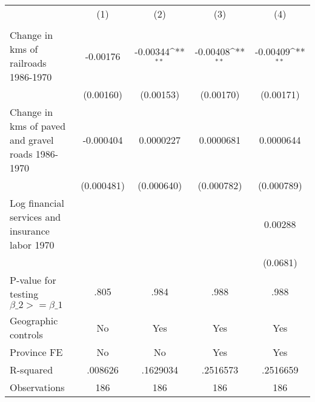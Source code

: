 {
\def\sym#1{\ifmmode^{#1}\else\(^{#1}\)\fi}
\begin{tabular}{l*{4}{c}}
\hline\hline
                &\multicolumn{1}{c}{(1)}&\multicolumn{1}{c}{(2)}&\multicolumn{1}{c}{(3)}&\multicolumn{1}{c}{(4)}\\
                &\multicolumn{1}{c}{}&\multicolumn{1}{c}{}&\multicolumn{1}{c}{}&\multicolumn{1}{c}{}\\
\hline
Change in kms of railroads 1986-1970& -0.00176         & -0.00344\sym{**} & -0.00408\sym{**} & -0.00409\sym{**} \\
                &(0.00160)         &(0.00153)         &(0.00170)         &(0.00171)         \\
[1em]
Change in kms of paved and gravel roads 1986-1970&-0.000404         &0.0000227         &0.0000681         &0.0000644         \\
                &(0.000481)         &(0.000640)         &(0.000782)         &(0.000789)         \\
[1em]
Log financial services and insurance labor 1970&                  &                  &                  &  0.00288         \\
                &                  &                  &                  & (0.0681)         \\
\hline
P-value for testing $\beta\_{2} >= \beta\_{1}$&     .805         &     .984         &     .988         &     .988         \\
Geographic controls&       No         &      Yes         &      Yes         &      Yes         \\
Province FE     &       No         &       No         &      Yes         &      Yes         \\
R-squared       &  .008626         & .1629034         & .2516573         & .2516659         \\
Observations    &      186         &      186         &      186         &      186         \\
\hline\hline
\end{tabular}
}

